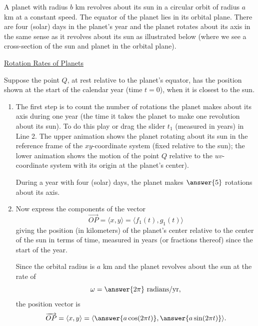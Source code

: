 \documentclass{ximera}
\begin{document}
\begin{question} \label{Ec56r4322}
A planet with radius $b$ km revolves about its sun in a circular orbit of radius $a$ km at a constant speed. The equator of the planet lies in its orbital plane. There are four (solar) days in the planet's year and the planet rotates about its axis in the same sense as it revolves about its sun as illustrated below (where we see a cross-section of the sun and planet in the orbital plane).



 
\begin{onlineOnly}
    \begin{center}
\end{center}
\end{onlineOnly}

\href{https://www.desmos.com/calculator/golluueo9z}{Rotation Rates of Planets}

Suppose the point $Q$, at rest relative to the planet's equator, has the position shown at the start of the calendar year (time $t=0$), when it is closest to the sun.

\begin{enumerate}
\item The first step is to count the number of rotations the planet makes about its axis during one year (the time it takes the planet  to make one revolution about its sun). To do this play or drag the slider $t_1$ (measured in years) in Line 2. The upper animation shows the planet rotating about its sun in the reference frame of the $xy$-coordinate system (fixed relative to the sun); the lower animation shows the motion of the point $Q$ relative to the $uv$-coordinate system with its origin at the planet's center). 

During a year with four (solar) days, the planet makes $\answer{5}$ rotations about its axis.

\item Now express the components of the vector
\[
  \overrightarrow{OP}  = \langle x , y\rangle =   \langle f_1(t) , g_1(t) \rangle
\]
giving the position (in kilometers) of the planet's center relative to the center of the sun in terms of time, measured in years (or fractions thereof) since the start of the year.

Since the orbital radius is $a$ km and the planet revolves about the sun at the rate of 
\[
    \omega = \answer{2\pi} \text{ radians/yr},
\]
the position vector is
\[
  \overrightarrow{OP}  = \langle x , y\rangle =  \langle \answer{a\cos (2\pi t)} , \answer{a\sin (2\pi t)} \rangle. 
\]


\end{enumerate}
\end{question}
\end{document}
